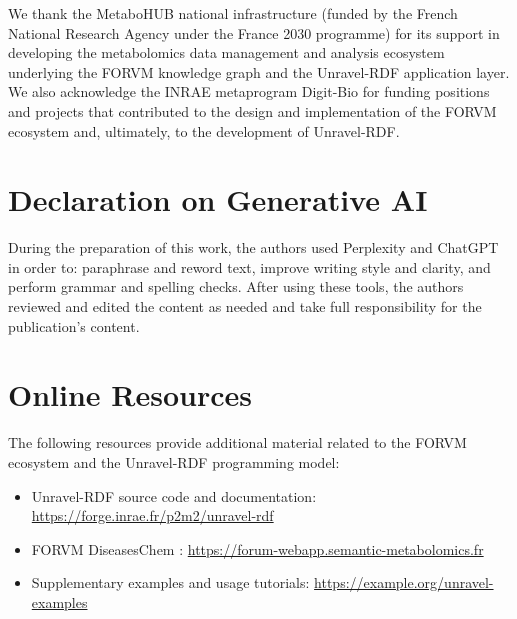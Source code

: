 \documentclass[
]{ceurart}
\begin{document}
\begin{acknowledgments}
We thank the MetaboHUB national infrastructure (funded by the French
National Research Agency under the France 2030 programme) for its
support in developing the metabolomics data management and analysis
ecosystem underlying the FORVM knowledge graph and the Unravel-RDF
application layer. We also acknowledge the INRAE metaprogram
Digit-Bio for funding positions and projects that contributed to the
design and implementation of the FORVM ecosystem and, ultimately,
to the development of Unravel-RDF.
\end{acknowledgments}


\section*{Declaration on Generative AI}

During the preparation of this work, the authors used Perplexity and
ChatGPT in order to: paraphrase and reword text, improve writing
style and clarity, and perform grammar and spelling checks. After using these
tools, the authors reviewed and edited the content as needed and take
full responsibility for the publication’s content.




\appendix



\section{Online Resources}

The following resources provide additional material related to the
FORVM ecosystem and the Unravel-RDF programming model:
\begin{itemize}
  \item Unravel-RDF source code and documentation:
    \href{https://forge.inrae.fr/p2m2/unravel-rdf}{https://forge.inrae.fr/p2m2/unravel-rdf}
  \item FORVM DiseasesChem :
    \href{https://forum-webapp.semantic-metabolomics.fr}{https://forum-webapp.semantic-metabolomics.fr}
  \item Supplementary examples and usage tutorials:
    \href{https://example.org/unravel-examples}{https://example.org/unravel-examples}
\end{itemize}
\end{document}
